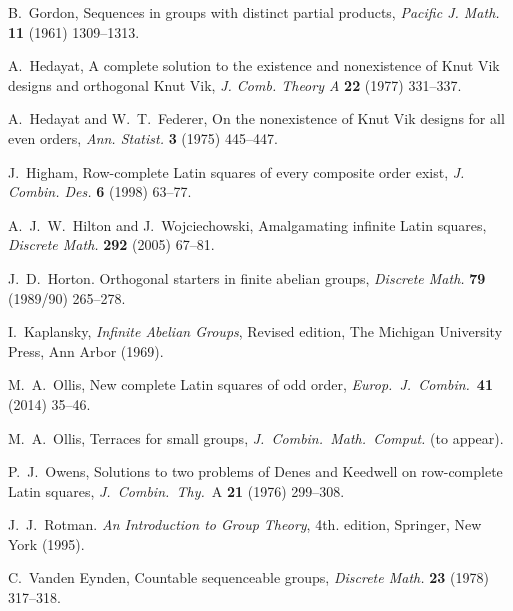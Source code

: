 \documentclass[12pt,a4paper]{article}
\begin{document}
\begin{thebibliography}{99}
 B.~Gordon, Sequences in groups with distinct partial products, {\em Pacific J. Math.} {\bf 11} (1961) 1309--1313.


 A.~Hedayat, A complete solution to the existence and nonexistence of Knut Vik designs and orthogonal Knut Vik, {\em J. Comb. Theory A} {\bf 22}  (1977) 331--337.

 A.~Hedayat and W.~T.~Federer, On the nonexistence of Knut Vik designs for all even orders, {\em Ann. Statist.} {\bf 3} (1975) 445--447.


J.~Higham, Row-complete Latin squares of every composite order exist, {\em J. Combin. Des.} {\bf 6} (1998) 63--77. 

A.~J.~W.~Hilton and J.~Wojciechowski, Amalgamating infinite Latin squares, {\em Discrete Math.} {\bf 292} (2005) 67--81.


J.~D.~Horton. Orthogonal starters in finite abelian groups, {\em Discrete Math.} {\bf 79} (1989/90) 265--278. 


I.~Kaplansky, {\em Infinite Abelian Groups}, Revised edition, The Michigan University Press, Ann Arbor (1969).



M.~A.~Ollis, New complete Latin squares of odd order, {\em Europ.~J.~Combin.}~{\bf 41} (2014) 35--46.

M.~A.~Ollis, Terraces for small groups, {\em J.~Combin.~Math.~Comput.} (to appear).

P.~J.~Owens,  Solutions to two problems of Denes and Keedwell on row-complete
Latin squares, {\em J.~Combin.~Thy.}~A {\bf 21} (1976) 299--308.

J.~J.~Rotman. {\em An Introduction to Group Theory}, 4th. edition, Springer, New York (1995).




C.~Vanden Eynden, Countable sequenceable groups, {\em Discrete Math.} {\bf 23} (1978) 317--318.




\end{thebibliography}
\end{document}
